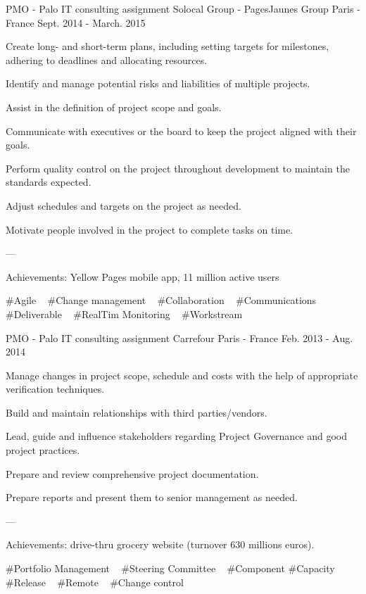 \begin{cventries}
  \cventry
    {PMO - Palo IT consulting assignment} %
    {Solocal Group - PagesJaunes Group} %
    {Paris - France} %
    {Sept. 2014 - March. 2015} %
    {
      \begin{cvitems} %
        \item {Create long- and short-term plans, including setting targets for milestones, adhering to deadlines and allocating resources.}
        \item {Identify and manage potential risks and liabilities of multiple projects.}
        \item {Assist in the definition of project scope and goals.}
        \item {Communicate with executives or the board to keep the project aligned with their goals.}
        \item {Perform quality control on the project throughout development to maintain the standards expected.}
        \item {Adjust schedules and targets on the project as needed.}
        \item {Motivate people involved in the project to complete tasks on time.}
        \item {---}
        \item {Achievements: Yellow Pages mobile app, 11 million active users}
      \end{cvitems}
    }
    {
      \#Agile ~
      \#Change management ~
      \#Collaboration ~
      \#Communications ~
      \#Deliverable ~
      \#RealTim Monitoring ~
      \#Workstream ~
    }

  \cventry
    {PMO - Palo IT consulting assignment} %
    {Carrefour} %
    {Paris - France} %
    {Feb. 2013 - Aug. 2014} %
    {
      \begin{cvitems} %
        \item {Manage changes in project scope, schedule and costs with the help of appropriate verification techniques.}
        \item {Build and maintain relationships with third parties/vendors.}
        \item {Lead, guide and influence stakeholders regarding Project Governance and good project practices.}
        \item {Prepare and review comprehensive project documentation.}
        \item {Prepare reports and present them to senior management as needed.}
        \item {---}
        \item {Achievements: drive-thru grocery website (turnover 630 millions euros).}
      \end{cvitems}
    }
    {
      \#Portfolio Management ~
      \#Steering Committee ~
      \#Component
      \#Capacity
      \#Release ~
      \#Remote ~
      \#Change control ~
    }


\end{cventries}
